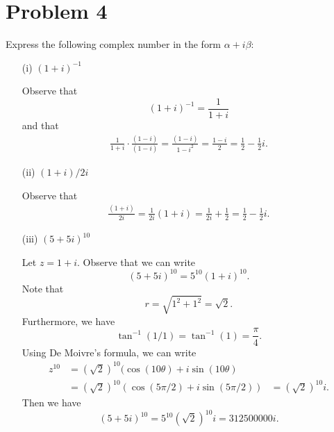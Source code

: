 \documentclass[a4paper]{article}
\begin{document}
    \section*{Problem 4} Express the following complex number in the form \( \alpha + i \beta  \):
        \begin{enumerate}
            \item[(i)] \( (1 + i)^{-1} \)
                \begin{solution}
                   Observe that  
                   \[  (1 + i)^{-1} = \frac{ 1 }{  1 + i }  \]
                   and that 
                   \begin{align*}
                      \frac{ 1 }{  1 + i  }  \cdot \frac{ (1 - i)  }{  (1- i) } = \frac{ (1- i) }{ 1 - i^{2} } = \frac{ 1 - i  }{ 2 } = \frac{ 1 }{ 2 }  - \frac{ 1 }{ 2 }  i.
                   \end{align*}
                \end{solution}
            \item[(ii)] \( (1 + i) / 2i \)
                \begin{solution}
                 Observe that    
                 \begin{align*}
                     \frac{ (1 + i) }{ 2i  }  = \frac{ 1 }{ 2i }  (1 + i) = \frac{ 1 }{ 2i }  + \frac{ 1 }{ 2 } = \frac{ 1 }{ 2 }  - \frac{ 1 }{ 2 }  i.  
                 \end{align*}
                \end{solution}
            \item[(iii)] \( (5 + 5i)^{10} \)
                \begin{solution}
                 Let \( z = 1 + i \). Observe that we can write   
                 \[  (5 + 5i)^{10} = 5^{10} (1 + i)^{10}. \]
                 Note that  
                 \[  r = \sqrt{ 1^{2} + 1^{2} }  = \sqrt{ 2 }. \]
                 Furthermore, we have
                 \[  \tan^{-1}(  1 / 1  ) = \tan^{-1}(1) = \frac{ \pi  }{ 4 }. \]
                 Using De Moivre's formula, we can write
                 \begin{align*}
                     z^{10} &= (\sqrt{ 2 })^{10}  (\cos(10 \theta ) + i \sin(10 \theta) \\
                           &=  (\sqrt{ 2 } )^{10} (\cos(5 \pi / 2 ) + i \sin( 5 \pi / 2))
                           &= (\sqrt{ 2 } )^{10} i.
                \end{align*}
                Then we have
                \[  (5 + 5i)^{10} = 5^{10} (\sqrt{ 2 } )^{10} i = 312500000 i. \]

\end{solution}
\end{enumerate}
\end{document}

